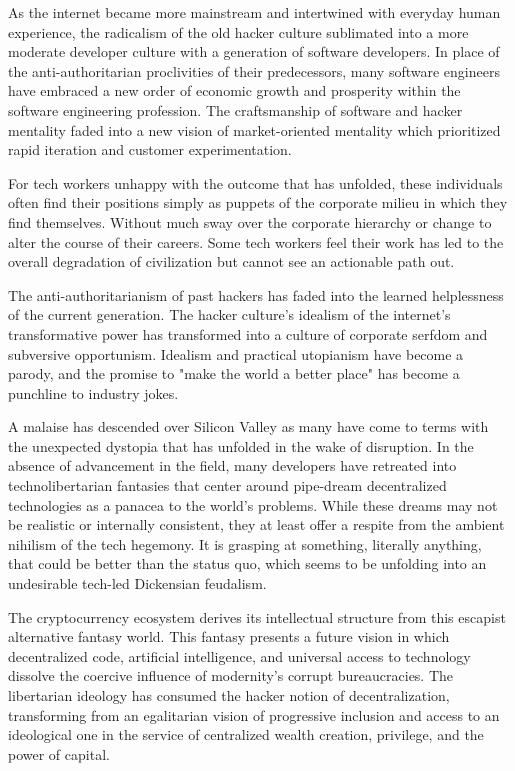 As the internet became more mainstream and intertwined with everyday human
experience, the radicalism of the old hacker culture sublimated into a more
moderate developer culture with a generation of software developers. In place of
the anti-authoritarian proclivities of their predecessors, many software
engineers have embraced a new order of economic growth and prosperity within the
software engineering profession. The craftsmanship of software and hacker
mentality faded into a new vision of market-oriented mentality which prioritized
rapid iteration and customer experimentation.

For tech workers unhappy with the outcome that has unfolded, these individuals
often find their positions simply as puppets of the corporate milieu in which
they find themselves. Without much sway over the corporate hierarchy or change
to alter the course of their careers. Some tech workers feel their work has led
to the overall degradation of civilization but cannot see an actionable path
out.

The anti-authoritarianism of past hackers has faded into the learned
helplessness of the current generation. The hacker culture's idealism of the
internet's transformative power has transformed into a culture of corporate
serfdom and subversive opportunism. Idealism and practical utopianism have
become a parody, and the promise to "make the world a better place" has become a
punchline to industry jokes.

A malaise has descended over Silicon Valley as many have come to terms with the
unexpected dystopia that has unfolded in the wake of disruption. In the absence
of advancement in the field, many developers have retreated into
technolibertarian fantasies that center around pipe-dream decentralized
technologies as a panacea to the world's problems. While these dreams may not be
realistic or internally consistent, they at least offer a respite from the
ambient nihilism of the tech hegemony. It is grasping at something, literally
anything, that could be better than the status quo, which seems to be unfolding
into an undesirable tech-led Dickensian feudalism.

The cryptocurrency ecosystem derives its intellectual structure from this
escapist alternative fantasy world. This fantasy presents a future vision in
which decentralized code, artificial intelligence, and universal access to
technology dissolve the coercive influence of modernity's corrupt bureaucracies.
The libertarian ideology has consumed the hacker notion of decentralization,
transforming from an egalitarian vision of progressive inclusion and access to
an ideological one in the service of centralized wealth creation, privilege, and
the power of capital. \cite{narayanan2013happened}

